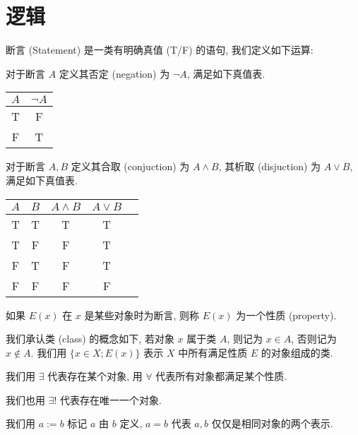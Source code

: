 \section{逻辑}

断言 (Statement) 是一类有明确真值 (T/F) 的语句, 我们定义如下运算:

\begin{definition}
    对于断言 \(A\) 定义其否定 (negation) 为 \(\neg A\), 满足如下真值表.
    \begin{center}
        \begin{tabular}{|c|c|}
            \hline
            \(A\) & \(\neg A\) \\
            \hline
            T & F \\
            \hline
            F & T \\
            \hline
        \end{tabular}
    \end{center}

    对于断言 \(A, B\) 定义其合取 (conjuction) 为 \(A \wedge B\), 其析取 (disjuction) 为 \(A \vee B\), 满足如下真值表.

    \begin{center}
        \begin{tabular}{|c|c|c|c|c|}
            \hline
            \(A\) & \(B\) & \(A \wedge B\) & \(A \vee B\) \\
            \hline
            T & T & T & T \\
            \hline
            T & F & F & T \\
            \hline
            F & T & F & T \\
            \hline
            F & F & F & F \\
            \hline
        \end{tabular}
    \end{center}
\end{definition}

\begin{definition}
    如果 \(E(x)\) 在 \(x\) 是某些对象时为断言, 则称 \(E(x)\) 为一个性质 (property).
\end{definition}

我们承认类 (class) 的概念如下, 若对象 \(x\) 属于类 \(A\), 则记为 \(x \in A\), 否则记为 \(x \notin A\).
我们用 \(\{x \in X; E(x)\}\) 表示 \(X\) 中所有满足性质 \(E\) 的对象组成的类.

\begin{definition}
    我们用 \(\exists\) 代表存在某个对象, 用 \(\forall\) 代表所有对象都满足某个性质.

    我们也用 \(\exists !\) 代表存在唯一一个对象.

    我们用 \(a := b\) 标记 \(a\) 由 \(b\) 定义, \(a = b\) 代表 \(a, b\) 仅仅是相同对象的两个表示.
\end{definition}


